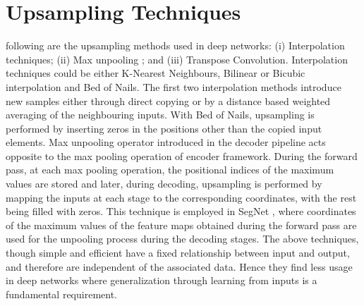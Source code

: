 \documentclass[journal]{IEEEtran}
\begin{document}
\section{Upsampling Techniques}\label{sec:UpSampling Techniques}
 following are the upsampling methods used in deep networks: (i) Interpolation techniques; (ii) Max unpooling \cite{article6}; and (iii) Transpose Convolution. Interpolation techniques could be either K-Nearest Neighbours, Bilinear or Bicubic interpolation and Bed of Nails. The first two interpolation methods introduce new samples either through direct copying or by a distance based weighted averaging of the neighbouring inputs. With Bed of Nails, upsampling is performed by inserting zeros in the positions other than the copied input elements. Max unpooling operator introduced in the decoder pipeline acts opposite to the max pooling operation of encoder framework. During the forward pass, at each max pooling operation, the positional indices of the maximum values are stored and later, during decoding, upsampling is performed by mapping the inputs at each stage to the corresponding coordinates, with the rest being filled with zeros. This technique is employed in SegNet  \cite{article7}, where coordinates of the maximum values of the feature maps obtained during the forward pass are used for the unpooling process during the decoding stages. The above techniques, though simple and efficient  have a fixed relationship between input and output, and therefore are independent of the associated data. Hence they find less usage in deep networks where generalization through learning from inputs is a fundamental requirement.  
\end{document}
